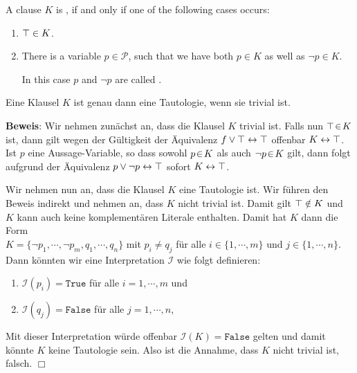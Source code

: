 \begin{Definition}
  A clause $K$ is , if and only if one of the following cases occurs:
  \begin{enumerate}
  \item $\top \in K$.
  \item There is a variable  $p \in \mathcal{P}$, such that we have both $p \in K$ as well as $\neg p \in K$.

        In this case $p$ and $\neg p$ are called  .
        \eox
\end{enumerate}
\end{Definition}

\begin{Satz} \label{satz:trivial}
  Eine Klausel $K$ ist genau dann eine Tautologie, wenn sie trivial ist.
\end{Satz}
\textbf{Beweis}:  Wir nehmen zunächst an, dass die Klausel $K$ trivial ist.
Falls nun $\top \!\in\! K$ ist, dann gilt wegen der Gültigkeit der Äquivalenz 
$f \vee \top \leftrightarrow \top$
offenbar $K \leftrightarrow \top$.   Ist $p$ eine Aussage-Variable, so dass
sowohl $p \!\in\! K$ als auch $\neg p \!\in\! K$ gilt, dann folgt aufgrund der Äquivalenz $p \vee
\neg p \leftrightarrow \top$ sofort $K \leftrightarrow \top$.

Wir nehmen nun an, dass die Klausel $K$ eine Tautologie ist.  Wir führen den Beweis
indirekt und nehmen an, dass $K$ nicht trivial ist.  Damit gilt  $\top \notin K$ und
$K$ kann auch keine komplementären Literale enthalten.  Damit hat $K$ dann die Form
\\[0.2cm]
\hspace*{1.3cm} 
$K = \{ \neg p_1, \cdots, \neg p_m, q_1, \cdots, q_n \}$ \quad mit $p_i
\not= q_j$ für alle $i \in \{ 1,\cdots,m\}$ und $j \in \{1, \cdots, n\}$.
\\[0.2cm]
Dann könnten wir eine Interpretation $\mathcal{I}$ wie folgt definieren:
\begin{enumerate}
\item $\mathcal{I}(p_i) = \texttt{True}$ für alle $i = 1, \cdots, m$ und
\item $\mathcal{I}(q_j) = \texttt{False}$ für alle $j = 1, \cdots, n$,
\end{enumerate}
Mit dieser Interpretation würde offenbar $\mathcal{I}(K) = \texttt{False}$ gelten und damit könnte $K$ keine
Tautologie sein.  Also ist die Annahme, dass $K$ nicht trivial ist, falsch.
\hspace*{\fill}  $\Box$

